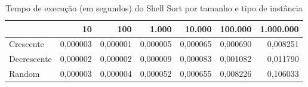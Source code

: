 \begin{table}[htbp]
    \centering
    \begin{tabular}{|l|r|r|r|r|r|r|}
        \hline
         & 10 & 100 & 1.000 & 10.000 & 100.000 & 1.000.000 \\
        \hline
        Crescente & 0,000003 & 0,000001 & 0,000005 & 0,000065 & 0,000690 & 0,008251 \\
        \hline
        Decrescente & 0,000002 & 0,000002 & 0,000009 & 0,000083 & 0,001082 & 0,011790 \\
        \hline
        Random & 0,000003 & 0,000004 & 0,000052 & 0,000655 & 0,008226 & 0,106033 \\
        \hline
    \end{tabular}
    \caption{Tempo de execução (em segundos) do Shell Sort por tamanho e tipo de instância}
    \label{tab:tempos_shell}
\end{table}
